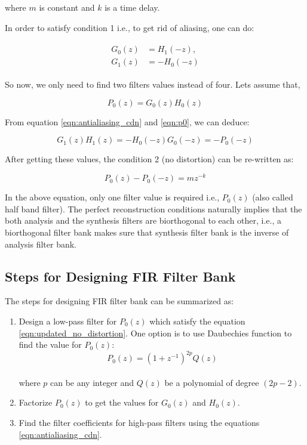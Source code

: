 where $m$ is constant and $k$ is a time delay.

In order to satisfy condition 1 i.e., to get rid of aliasing, one can do:

\begin{align}
\label{eqn:antialiasing_cdn}
\begin{split}
	G_0(z) &=  H_1(-z), \\ 
	G_1(z) &=  -H_0(-z)
\end{split}
\end{align}


So now, we only need to find two filters values instead of four. Lets assume that,

\begin{equation}\label{eqn:p0} 
{P_0(z)=G_{0}(z)H_{0}(z)}
\end{equation}

From equation \ref{eqn:antialiasing_cdn} and \ref{eqn:p0}, we can deduce:

\begin{equation} 
{G_{1}(z)H_{1}(z) = -H_{0}(-z)G_{0}(-z) = -P_0(-z)}
\end{equation}

After getting these values, the condition 2 (no distortion) can be re-written as:

\begin{equation}\label{eqn:updated_no_distortion} 
{P_0(z) - P_0(-z) =  mz^{-k}}
\end{equation}

In the above equation, only one filter value is required i.e., $P_0(z)$ (also called half band filter). The perfect reconstruction conditions naturally implies that the both analysis and the synthesis filters are biorthogonal to each other, i.e., a biorthogonal filter bank makes sure that synthesis filter bank is the inverse of analysis filter bank.


\subsection{Steps for Designing FIR Filter Bank}
The steps for designing FIR filter bank can be summarized as:

\begin{enumerate}
	\item Design a low-pass filter for $P_0(z)$ which satisfy the equation \ref{eqn:updated_no_distortion}. One option is to use Daubechies function to find the value for $P_0(z)$: \\ 
	\begin{equation}\label{eqn:updated_no_distortion} 
	{P_0(z) = (1 + z^{-1})^{2p}Q(z)}
	\end{equation} \\
	where $p$ can be any integer and $Q(z)$ be a polynomial of degree $(2p-2)$.
	\item Factorize $P_0(z)$ to get the values for $G_0(z)$ and $H_0(z)$.
	\item Find the filter coefficients for high-pass filters using the equations \ref{eqn:antialiasing_cdn}. 
\end{enumerate}


